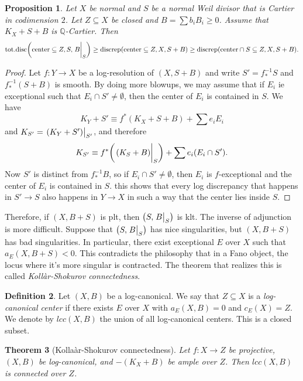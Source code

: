 \documentclass[leqno, openany]{memoir}
\newtheorem{thm}{Theorem}[section]
\newtheorem{prop}[thm]{Proposition}
\theoremstyle{definition}
\newtheorem{defn}[thm]{Definition}
\theoremstyle{remark}
\theoremstyle{plain}
\theoremstyle{definition}
\theoremstyle{remark}
\newcommand{\Q}{\mathbb{Q}}
\begin{document}
\begin{prop}
    Let $X$ be normal and $S$ be a normal Weil divisor that is Cartier in codimension $2$.  Let $Z \subseteq X$ be closed and $B = \sum b_i B_i \geq 0$. Assume that $K_X + S + B$ is $\Q$-Cartier. Then
    \[ \text{tot.disc}\qty(\text{center} \subseteq Z, S, \eval{B}_S) \geq \text{discrep}(\text{center} \subseteq Z, X, S+B) \geq \text{discrep}(\text{center} \cap S \subseteq Z, X, S + B). \]
\end{prop}

\begin{proof}
    Let $f \colon Y \to X$ be a log-resolution of $(X, S+B)$ and write $S' = f_*^{-1} S$ and $f_*^{-1}(S + B)$ is smooth. By doing more blowups, we may assume that if $E_i$ ie exceptional such that $E_i \cap S' \neq \emptyset$, then the center of $E_i$ is contained in $S$. We have
    \[ K_Y + S' \equiv f^*(K_X + S + B) + \sum e_i E_i \] and $K_{S'} = \eval{(K_Y + S')}_{S'}$, and therefore
    \[ K_{S'} \equiv f^* \qty( \eval{(K_S + B)}_S ) + \sum e_i (E_i \cap S'). \]
    Now $S'$ is distinct from $f_*^{-1}B$, so if $E_i \cap S' \neq \emptyset$, then $E_i$ is $f$-exceptional and the center of $E_i$ is contained in $S$. this shows that every log discrepancy that happens in $S' \to S$ also happens in $Y \to X$ in such a way that the center lies inside $S$.
\end{proof}

Therefore, if $(X, B+S)$ is plt, then $\qty(S, \eval{B}_S)$ is klt. The inverse of adjunction is more difficult. Suppose that $\qty(S, \eval{B}_S)$ has nice singularities, but $(X, B+S)$ has bad singularities. In particular, there exist exceptional $E$ over $X$ such that $a_E(X, B+S) < 0$. This contradicts the philosophy that in a Fano object, the locus where it's more singular is contracted. The theorem that realizes this is called \textit{Koll\`ar-Shokurov connectedness}.

\begin{defn}
    Let $(X, B)$ be a log-canonical. We say that $Z \subseteq X$ is a \textit{log-canonical center} if there exists $E$ over $X$ with $a_E(X, B) = 0$ and $c_E(X) = Z$. We denote by $lcc(X, B)$ the union of all log-canonical centers. This is a closed subset.
\end{defn}

\begin{thm}[Kolla\`ar-Shokurov connectedness]
    Let $f \colon X \to Z$ be projective, $(X, B)$ be log-canonical, and $-(K_X + B)$ be ample over $Z$. Then $lcc(X, B)$ is connected over $Z$.
\end{thm}
\end{document}
